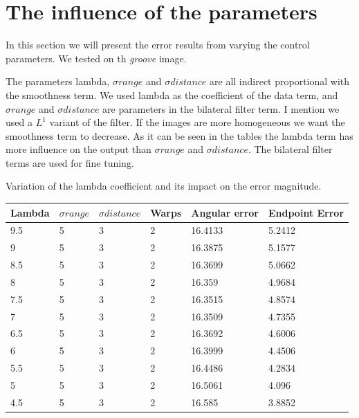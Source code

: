 \documentclass[12pt,a4paper,twoside]{report}
\begin{document}
{\section{The influence of the parameters}
 In this section we will present the error results from varying the control parameters. We tested on th \textit{groove} image.
 
 The parameters lambda,  $\sigma range$ and $\sigma distance$ are all indirect proportional with the smoothness term. We used lambda as the coefficient of the data term, and $\sigma range$ and $\sigma distance$ are parameters in the bilateral filter term. I mention we used a $L^1$ variant of the filter. If the images are more homogeneous we want the smoothness term to decrease. As it can be seen in the tables the lambda term has more influence on the output than  $\sigma range$ and $\sigma distance$. The bilateral filter terms are used for fine tuning.
 
 \newpage
 Variation of the lambda coefficient and its impact on the error magnitude.
 \begin{center}
 	\begin{tabular}{  l  l  l  l  l l}
 		\hline
 		Lambda &  $\sigma range$ & $\sigma distance$& Warps & Angular error & Endpoint Error \\ \hline
 		\hline
9.5 & 5 & 3 & 2 & 16.4133 & 5.2412\\ 
9 & 5 & 3 & 2 & 16.3875 & 5.1577\\ 
8.5 & 5 & 3 & 2 & 16.3699 & 5.0662\\ 
8 & 5 & 3 & 2 & 16.359 & 4.9684\\ 
7.5 & 5 & 3 & 2 & 16.3515 & 4.8574\\ 
7 & 5 & 3 & 2 & 16.3509 & 4.7355\\ 
6.5 & 5 & 3 & 2 & 16.3692 & 4.6006\\ 
6 & 5 & 3 & 2 & 16.3999 & 4.4506\\ 
5.5 & 5 & 3 & 2 & 16.4486 & 4.2834\\ 
5 & 5 & 3 & 2 & 16.5061 & 4.096\\ 
4.5 & 5 & 3 & 2 & 16.585 & 3.8852\\ 
 	\end{tabular}
 \end{center} 
 
}
\end{document}
